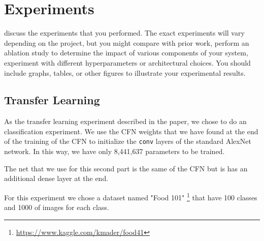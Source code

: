 \section{Experiments}
discuss the experiments that you performed. The exact experiments will vary depending on the project, but you might compare with prior work, perform an ablation study to determine the impact of various components of your system, experiment with different hyperparameters or architectural choices. You should include graphs, tables, or other figures to illustrate your experimental results.

\subsection{Transfer Learning}
As the transfer learning experiment described in the paper, we chose to do an classification experiment. We use the CFN weights that we have found at the end of the training of the CFN to initialize the \texttt{conv} layers of the standard AlexNet network. In this way, we have only 8,441,637 parameters to be trained.

The net that we use for this second part is the same of the CFN but is has an additional dense layer at the end.

For this experiment we chose a dataset named "Food 101" \footnote{\url{https://www.kaggle.com/kmader/food41}} that have 100 classes and 1000 of images for each class.



